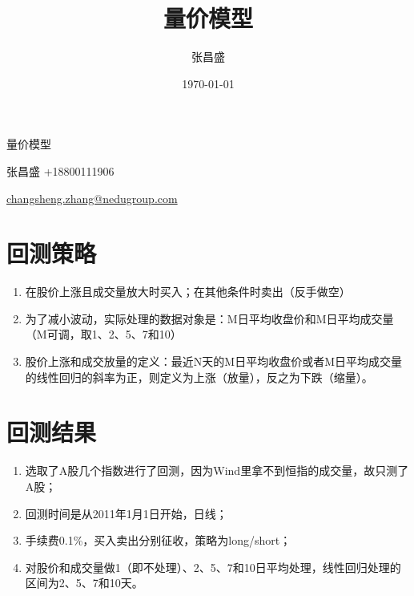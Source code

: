 \documentclass[12pt,a4paper]{article}
\title{量价模型}
\author{张昌盛}
\date{\today}
\begin{document}
 

\begin{titlepage}

\vspace{6pt}
\begin{center}
{\huge \fontsize{24bp}{\baselineskip} 量价模型 }
\end{center}

\hspace{270pt}
{\fontsize{16bp}{\baselineskip}张昌盛 +18800111906}


\hspace{270pt}
{\fontsize{16bp}{\baselineskip} \href{mailto:changsheng.zhang@nedugroup.com}{changsheng.zhang@nedugroup.com}}

\normalsize

\tableofcontents

\end{titlepage}

\newpage

\section{回测策略}

\begin{enumerate}
\item 在股价上涨且成交量放大时买入；在其他条件时卖出（反手做空）
\item 为了减小波动，实际处理的数据对象是：M日平均收盘价和M日平均成交量（M可调，取1、2、5、7和10）
\item 股价上涨和成交放量的定义：最近N天的M日平均收盘价或者M日平均成交量的线性回归的斜率为正，则定义为上涨（放量），反之为下跌（缩量）。

\end{enumerate}

\section{回测结果}
\begin{enumerate}
\item 选取了A股几个指数进行了回测，因为Wind里拿不到恒指的成交量，故只测了A股；
\item 回测时间是从2011年1月1日开始，日线；
\item 手续费0.1\%，买入卖出分别征收，策略为long/short；
\item 对股价和成交量做1（即不处理）、2、5、7和10日平均处理，线性回归处理的区间为2、5、7和10天。
\end{enumerate}
\end{document}
